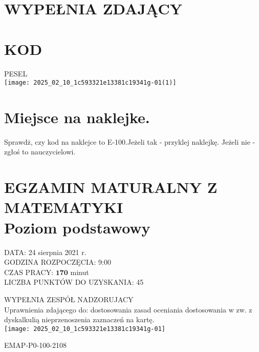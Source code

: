\documentclass[10pt]{article}
\begin{document}
\section*{WYPEŁNIA ZDAJĄCY}
\section*{KOD}
PESEL\\
\texttt{[image: 2025\_02\_10\_1c593321e13381c19341g-01(1)]}

\section*{Miejsce na naklejke.}
 Sprawdż, czy kod na naklejce to E-100.Jeżeli tak - przyklej naklejkę. Jeżeli nie - zgłoś to nauczycielowi.

\section*{EGZAMIN MATURALNY Z MATEMATYKI \\
 Poziom podstawowy}
DATA: 24 sierpnia 2021 r.\\
GODZINA ROZPOCZĘCIA: 9:00\\
CZAS PRACY: \(\mathbf{1 7 0}\) minut\\
LICZBA PUNKTÓW DO UZYSKANIA: 45

WYPEŁNIA ZESPÓŁ NADZORUJACY\\
Uprawnienia zdającego do: dostosowania zasad oceniania dostosowania w zw. z dyskalkulią nieprzenoszenia zaznaczeń na kartę.\\
\texttt{[image: 2025\_02\_10\_1c593321e13381c19341g-01]}

EMAP-P0-100-2108
\end{document}
